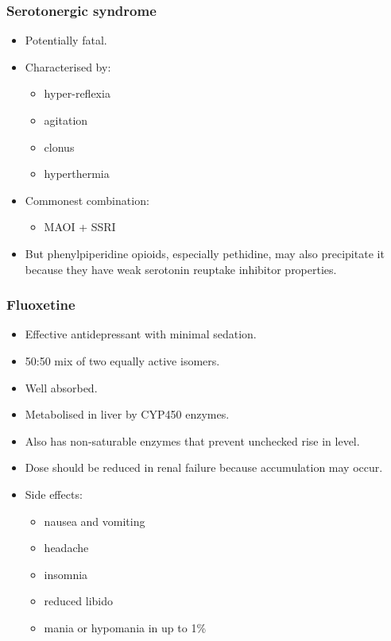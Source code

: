 \documentclass[11pt,a4paper]{article}
\begin{document}
\subsubsection{Serotonergic syndrome}
\begin{itemize}
  \item Potentially fatal.
  \item Characterised by:
  \begin{itemize}
    \item hyper-reflexia
    \item agitation
    \item clonus
    \item hyperthermia
  \end{itemize}
  \item Commonest combination:
  \begin{itemize}
    \item MAOI + SSRI
  \end{itemize}
  \item But phenylpiperidine opioids, especially pethidine, may also precipitate it because they have weak serotonin reuptake inhibitor properties.
\end{itemize}

\subsubsection{Fluoxetine}
\begin{itemize}
  \item Effective antidepressant with minimal sedation.
  \item 50:50 mix of two equally active isomers.
  \item Well absorbed.
  \item Metabolised in liver by CYP450 enzymes.
  \item Also has non-saturable enzymes that prevent unchecked rise in level.
  \item Dose should be reduced in renal failure because accumulation may occur.
  \item Side effects:
  \begin{itemize}
    \item nausea and vomiting
    \item headache
    \item insomnia
    \item reduced libido
    \item mania or hypomania in up to 1\%
  \end{itemize}
\end{itemize}
\end{document}
